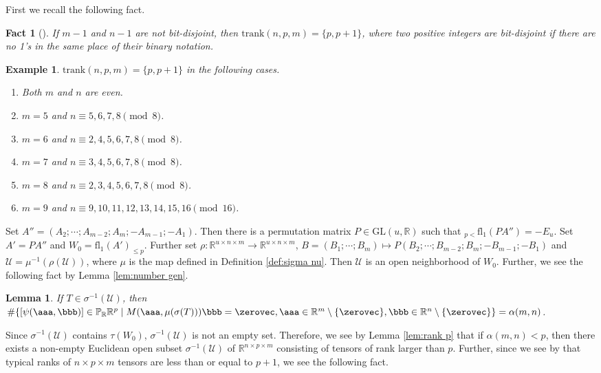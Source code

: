 \documentclass[a4paper,12pt]{article}
\newcommand{\PPP}{\mathbb{P}}
\newcommand{\RRR}{\mathbb{R}}
\newcommand{\msUUU}{\mathscr{U}}
\newcommand{\UUUUU}{{\mathcal U}}
\newcommand{\glin}{{\mathrm{GL}}}
\newcommand{\trank}{{\mathrm{trank}}}
\newcommand\fl{\mathrm{fl}}
\newtheorem{fact}[thm]{Fact}
\newtheorem{example}[thm]{Example}
\newtheorem{lemma}[thm]{Lemma}
\begin{document}
First we recall the following fact.

\begin{fact}[{\cite[Proposition 2.4, Lemma 3.5, Theorems 7.3 and 8.1]{sms17}}]
\label{fact:bit dis}
If $m-1$ and $n-1$ are not bit-disjoint, then $\trank(n,p,m)=\{p,p+1\}$,
where two positive integers are bit-disjoint if there are no 1's
in the same place of their binary notation.
\end{fact}

\begin{example}\rm
\label{ex:known}
$\trank(n,p,m)=\{p,p+1\}$ in the following cases.
\begin{enumerate}
\item
Both $m$ and $n$ are even.
\item
$m=5$ and $n\equiv 5,6,7,8\pmod 8$.
\item
$m=6$ and $n\equiv 2,4,5,6,7,8\pmod 8$.
\item
$m=7$ and $n\equiv 3,4,5,6,7,8\pmod 8$.
\item
$m=8$ and $n\equiv 2,3,4,5,6,7,8\pmod 8$.
\item
$m=9$ and $n\equiv 9,10,11,12,13,14,15,16\pmod {16}$.
\end{enumerate}
\end{example}


Set
$
A''=(A_2;\cdots;A_{m-2};A_m;-A_{m-1};-A_{1})$.
Then there is a permutation matrix $P\in\glin(u,\RRR)$ 
such that
${}_{p<}\fl_1(PA'')=-E_u$.
Set $A'=PA''$ and $W_0=\fl_1(A')_{\leq p}$.
Further set $\rho\colon\RRR^{u\times n\times m}\to\RRR^{u\times n\times m}$,
$B=(B_1;\cdots;B_m)\mapsto P(B_2;\cdots;B_{m-2};B_m;-B_{m-1};-B_{1})$
and $\UUUUU=\mu^{-1}(\rho(\msUUU))$,
where $\mu$ is the map defined in Definition \ref{def:sigma nu}.
Then $\UUUUU$ is an open neighborhood of $W_0$.
Further, we see the following fact by Lemma \ref{lem:number gen}.


\begin{lemma}
If $T\in\sigma^{-1}(\UUUUU)$, then
$\#\{[\psi(\aaa,\bbb)]\in\PPP_\RRR\RRR^p\mid
M(\aaa,\mu(\sigma(T)))\bbb=\zerovec,
\aaa\in\RRR^m\setminus\{\zerovec\},
\bbb\in\RRR^n\setminus\{\zerovec\}\}
=\alpha(m,n)$.
\end{lemma}
%
%
Since $\sigma^{-1}(\UUUUU)$ 
contains $\tau(W_0)$, $\sigma^{-1}(\UUUUU)$ is not an empty set.
Therefore, we see by Lemma \ref{lem:rank p} that if $\alpha(m,n)<p$, then
there exists a non-empty Euclidean open subset $\sigma^{-1}(\UUUUU)$ of $\RRR^{n\times p\times m}$
consisting of tensors of rank larger than $p$.
Further, since we see by \cite[Theorem 8.1]{sms17}
that typical ranks of $n\times p\times m$ tensors are less than or equal to
$p+1$, we see the following fact.
\end{document}
